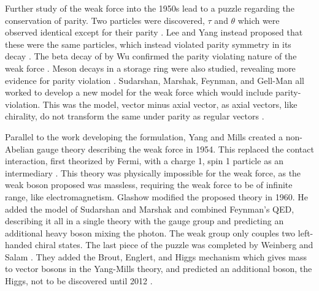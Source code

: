 Further study of the weak force into the 1950s lead to a puzzle regarding the conservation of parity.  Two particles were discovered, \ensuremath{\tau} and \ensuremath{\theta} which were observed identical except for their parity \cite{osti_4356004}.  Lee and Yang instead proposed that these were the same particles, which instead violated parity symmetry in its decay \cite{PhysRev.104.254}.  The beta decay of \cobaltsixty by Wu confirmed the parity violating nature of the weak force \cite{articlePARITYTEST}.  Meson decays in a storage ring were also studied, revealing more evidence for parity violation \cite{articlePARITYFAIL}.  Sudarshan, Marshak, Feynman, and Gell-Man all worked to develop a new model for the weak force which would include parity-violation.  This was the \vminusa  model, vector minus axial vector, as axial vectors, like chirality, do not transform the same under parity as regular vectors \cite{1898KNAB1427L}\cite{PhysRev.109.193}.

Parallel to the work developing the \vminusa formulation, Yang and Mills created a non-Abelian gauge theory describing the weak force in 1954.  This replaced the contact interaction, first theorized by Fermi, with a charge 1, spin 1 particle as an intermediary \cite{PhysRev.96.191}.  This theory was physically impossible for the weak force, as the weak boson proposed was massless, requiring the weak force to be of infinite range, like electromagnetism.  Glashow modified the proposed theory in 1960.  He added the \vminusa model of Sudarshan and Marshak and combined Feynman's QED, describing it all in a single theory with the gauge group \SUtwoUone \cite{GLASHOW1961579} and predicting an additional heavy boson mixing the photon.  The weak \SUtwoL group only couples two left-handed chiral states.  The last piece of the puzzle was completed by Weinberg and Salam \cite{PhysRevLett.19.1264}\cite{nla.cat-vn956113}.  They added the Brout, Englert, and Higgs mechanism \cite{PhysRevLett.13.321}\cite{PhysRevLett.13.508} which gives mass to vector bosons in the Yang-Mills theory, and predicted an additional boson, the Higgs, not to be discovered until 2012 \cite{higgs2012ATLAS}\cite{higgs2012CMS}.


